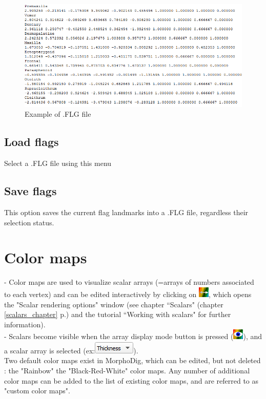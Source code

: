 \begin{figure}
  \centering
  \includegraphics[scale=0.5]{images/07/flags/FLG_file.png}
 \caption{Example of .FLG file}
\label{FLG_file}
\end{figure}

\subsection{Load flags}
Select a .FLG file using this menu

\subsection{Save flags}
This option saves the current flag landmarks into a .FLG file, regardless their selection status.


\section{Color maps}


- Color maps are used to visualize scalar arrays (=arrays of numbers associated to each vertex) and can be edited interactively by
clicking on \includegraphics[scale=0.7]{images/07/colormaps/colormaps.png}, which opens the "Scalar rendering options" window (see chapter
``Scalars" (chapter \ref{scalars_chapter} p.\pageref{scalars_chapter}) and the tutorial ``Working with scalars" for
further information).\\
- Scalars become visible when the array display mode button is pressed (\includegraphics[scale=0.7]{images/04/show_color_scale.png}), and a scalar array is selected (ex:\includegraphics[scale=0.5]{images/04/scalarcombo_scalar.png}).\\
Two default color maps exist in MorphoDig, which can be edited, but not deleted : the "Rainbow" the "Black-Red-White" color maps. Any number of additional color maps can be added to the list of existing color maps, and are referred to as "custom color maps".


